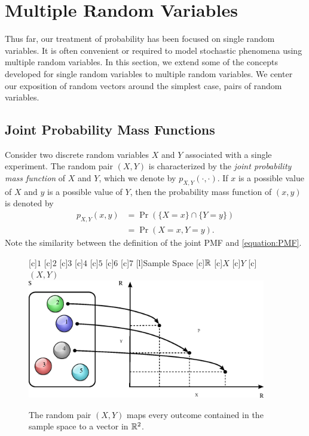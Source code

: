 \chapter{Multiple Random Variables}
\label{chapter:RandomVectorsDiscrete}

Thus far, our treatment of probability has been focused on single random variables.
It is often convenient or required to model stochastic phenomena using multiple random variables.
In this section, we extend some of the concepts developed for single random variables to multiple random variables.
We center our exposition of random vectors around the simplest case, pairs of random variables.


\section{Joint Probability Mass Functions}

Consider two discrete random variables $X$ and $Y$ associated with a single experiment.
The random pair $(X, Y)$ is characterized by the \emph{joint probability mass function} of $X$ and $Y$, which we denote by $p_{X,Y}(\cdot,\cdot)$. 
If $x$ is a possible value of $X$ and $y$ is a possible value of $Y$, then the probability mass function of $(x, y)$ is denoted by
\begin{equation*}
\begin{split}
p_{X,Y} (x, y) &= \Pr ( \{ X = x \} \cap \{ Y = y \} ) \\
&= \Pr ( X = x, Y = y ).
\end{split}
\end{equation*}
Note the similarity between the definition of the joint PMF and \eqref{equation:PMF}.

\begin{figure}[ht]
\begin{center}
\begin{psfrags}
[c]{$1$}
[c]{$2$}
[c]{$3$}
[c]{$4$}
[c]{$5$}
[c]{$6$}
[c]{$7$}
[l]{Sample Space}
[c]{$\mathbb{R}$}
[c]{$X$}
[c]{$Y$}
[c]{$(X,Y)$}
\includegraphics[height=5.20cm]{Figures/7Chapter/prv}
\end{psfrags}
\caption{The random pair $(X, Y)$ maps every outcome contained in the sample space to a vector in $\mathbb{R}^2$.}
\end{center}
\end{figure}

